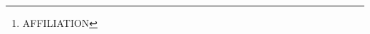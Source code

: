 \documentclass[letterpaper,10.5pt,uplatex]{jsarticle}
\theoremstyle{definition}
\begin{document}
\title{}
\author{NAME\thanks{AFFILIATION}}
\date{20**/**/**}
\maketitle

%
\end{document}
